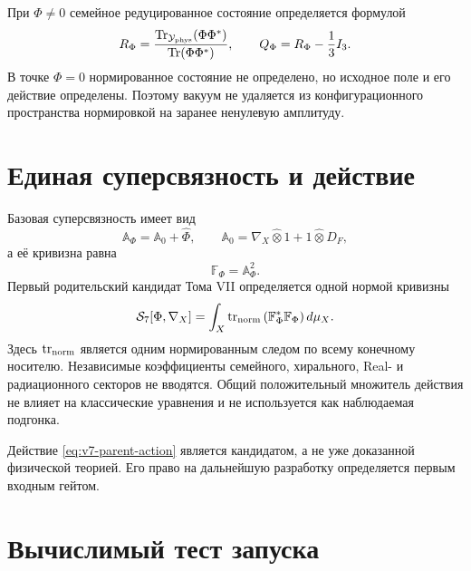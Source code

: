 При $\Phi\ne0$ семейное редуцированное состояние определяется формулой
\begin{equation}
 R_\Phi
 =\frac{\operatorname{Tr}_{\mathcal Y_{\rm phys}}(\Phi\Phi^*)}
 {\operatorname{Tr}(\Phi\Phi^*)},
 \qquad
 Q_\Phi=R_\Phi-\frac13I_3.
 \label{eq:v7-derived-order-parameter}
\end{equation}
В точке $\Phi=0$ нормированное состояние не определено, но исходное поле и
его действие определены. Поэтому вакуум не удаляется из конфигурационного
пространства нормировкой на заранее ненулевую амплитуду.

\section{Единая суперсвязность и действие}

Базовая суперсвязность имеет вид
\begin{equation}
 \mathbb A_\Phi
 =\mathbb A_0+\widehat\Phi,
 \qquad
 \mathbb A_0=\nabla_X\widehat\otimes1+1\widehat\otimes D_F,
 \label{eq:v7-parent-superconnection}
\end{equation}
а её кривизна равна
\begin{equation}
 \mathbb F_\Phi=\mathbb A_\Phi^2.
\end{equation}
Первый родительский кандидат Тома VII определяется одной нормой кривизны
\begin{equation}
 \mathcal S_7[\Phi,\nabla_X]
 =\int_X
 \operatorname{tr}_{\rm norm}
 \left(\mathbb F_\Phi^*\mathbb F_\Phi\right)d\mu_X.
 \label{eq:v7-parent-action}
\end{equation}
Здесь $\operatorname{tr}_{\rm norm}$ является одним нормированным следом по
всему конечному носителю. Независимые коэффициенты семейного, хирального,
Real- и радиационного секторов не вводятся. Общий положительный множитель
действия не влияет на классические уравнения и не используется как
наблюдаемая подгонка.

Действие \eqref{eq:v7-parent-action} является кандидатом, а не уже доказанной
физической теорией. Его право на дальнейшую разработку определяется первым
входным гейтом.

\section{Вычислимый тест запуска}

